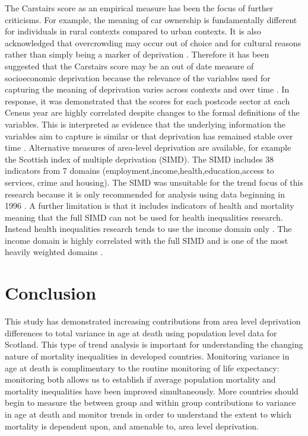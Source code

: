\documentclass[12pt,oneside,a4paper]{article} %
\theoremstyle{definition}
\begin{document}
The Carstairs score as an empirical measure has been the focus of further criticisms. For example, the meaning of car ownership is fundamentally different for individuals in rural contexts compared to urban contexts. It is also acknowledged that overcrowding may occur out of choice and for cultural reasons rather than simply being a marker of deprivation \citep{Fischbacher2014}. Therefore it has been suggested that the Carstairs score may be an out of date measure of socioeconomic deprivation \citep{Schofield2016,Tunstall2011} because the relevance of the variables used for capturing the meaning of deprivation varies across contexts and over time \citep{Norman2010}. In response, it was demonstrated that the scores for each postcode sector at each Census year are highly correlated despite changes to the formal definitions of the variables. This is interpreted as evidence that the underlying information the variables aim to capture is similar or that deprivation has remained stable over time \citep{Leyland2007}. Alternative measures of area-level deprivation are available, for example the Scottish index of multiple deprivation (SIMD). The SIMD includes 38 indicators from 7 domains (employment,income,health,education,access to services, crime and housing). The SIMD was unsuitable for the trend focus of this research because it is only recommended for analysis using data beginning in 1996 \citep{Health2017}. A further limitation is that it includes indicators of health and mortality meaning that the full SIMD can not be used for health inequalities research. Instead health inequalities research tends to use the income domain only \citep{Leyland2007a}. The income domain is highly correlated with the full SIMD and is one of the most heavily weighted domains \citep{Health2017,TheScottishGovernment2016}.   

\section{Conclusion}
This study has demonstrated increasing contributions from area level deprivation differences to total variance in age at death using population level data for Scotland. This type of trend analysis is important for understanding the changing nature of mortality inequalities in developed countries. Monitoring variance in age at death is complimentary to the routine monitoring of life expectancy: monitoring both allows us to establish if average population mortality and mortality inequalities have been improved simultaneously. More countries should begin to measure the between group and within group contributions to variance in age at death and monitor trends in order to understand the extent to which mortality is dependent upon, and amenable to, area level deprivation.
\end{document}
